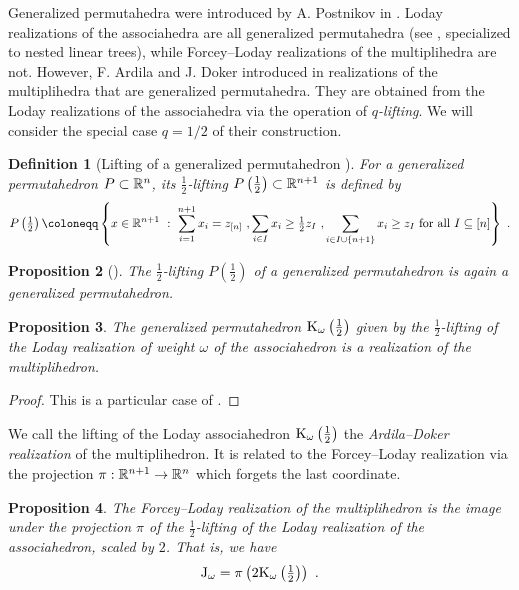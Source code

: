 \documentclass[10pt]{amsart}
\newtheorem{definition}{Definition}[section]
\newtheorem{proposition}[definition]{Proposition}
\theoremstyle{remark}
\begin{document}
Generalized permutahedra were introduced by A. Postnikov in \cite{Postnikov09}.
Loday realizations of the associahedra are all generalized permutahedra (see \cite[Corollary 2.16 (2)]{LA21}, specialized to nested linear trees), while Forcey--Loday realizations of the multiplihedra are not. 
However, F. Ardila and J. Doker introduced in \cite{AD13} realizations of the multiplihedra that are generalized permutahedra. 
They are obtained from the Loday realizations of the associahedra via the operation of \emph{$q$-lifting}. 
We will consider the special case $q=1/2$ of their construction.

\begin{definition}[Lifting of a generalized permutahedron {\cite[Definition 2.3]{AD13}}]
For a generalized permutahedron $P\subset \mathbb{R}^n$, its \emph{$\tfrac{1}{2}$-lifting} $P \left(\tfrac{1}{2}\right) \subset \mathbb{R}^{n+1}$ is defined by 
\[P \left(\tfrac{1}{2}\right) \coloneqq \left\{ x \in \RR^{n+1} \ : \ 
\sum_{i=1}^{n+1} x_i = z_{[n]} \ , 
\sum_{i \in I} x_i \geq \tfrac{1}{2}z_I \ ,
\sum_{i \in I \cup \{n+1\}} x_i \geq z_I 
\text{ for all } I \subseteq [n] \right\} \ . \]
\end{definition}

\begin{proposition}[{\cite[Proposition 2.4]{AD13}}] 
The $\tfrac{1}{2}$-lifting $P \left(\tfrac{1}{2}\right)$ of a generalized permutahedron is again a generalized permutahedron. 
\end{proposition}

\begin{proposition} 
The generalized permutahedron $\mathrm{K}_\omega\left(\tfrac{1}{2}\right)$ given by the $\tfrac{1}{2}$-lifting of the Loday realization of weight $\omega$ of the associahedron is a realization of the multiplihedron. 
\end{proposition}
\begin{proof} 
This is a particular case of \cite[Corollary 4.10]{AD13}.
\end{proof}

We call the lifting of the Loday associahedron $\mathrm{K}_\omega\left(\tfrac{1}{2}\right)$ the\emph{ Ardila--Doker realization} of the multiplihedron. It is related to the Forcey--Loday realization via the projection $\pi: \mathbb{R}^{n+1} \to \mathbb{R}^n$ which forgets the last coordinate. 
 
\begin{proposition} 
\label{prop:lifting} 
The Forcey--Loday realization of the multiplihedron is the image under the projection $\pi$ of the $\tfrac{1}{2}$-lifting of the Loday realization of the associahedron, scaled by $2$. 
That is, we have  \[ \mathrm{J}_\omega = \pi \left(2 \mathrm{K}_\omega\left(\tfrac{1}{2}\right)\right) \ . \]
\end{proposition}
\end{document}

